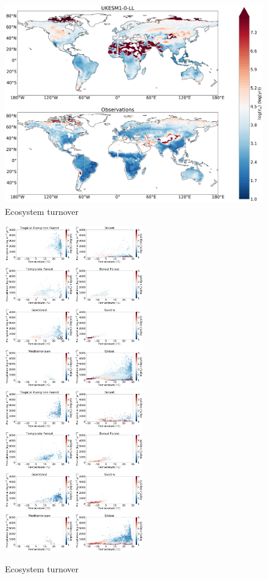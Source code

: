 \begin{figure}[t]
    \includegraphics[width=12cm]{figs/Turnover/ecosystem_tau_map_comparison.pdf}
    \caption{Ecosystem turnover \label{fig:EcoTurnoverlMap}}
\end{figure}

\begin{figure}[t]
    \includegraphics[width=6cm]{figs/Turnover/UKESM_ecosystem_colouredbytau_biome_log.pdf}
    \includegraphics[width=6cm]{figs/Turnover/obs1_ecosystem_colouredbytau_biome_log.pdf}
    \caption{Ecosystem turnover \label{fig:EcoTurnoverScatter}}
\end{figure}


